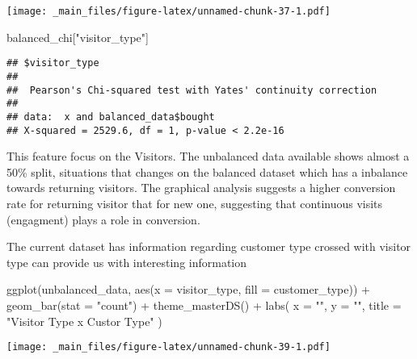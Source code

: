\documentclass[
]{book}
\newenvironment{Shaded}{\begin{snugshade}}{\end{snugshade}}
\newcommand{\AttributeTok}[1]{\textcolor[rgb]{0.77,0.63,0.00}{#1}}
\newcommand{\FunctionTok}[1]{\textcolor[rgb]{0.00,0.00,0.00}{#1}}
\newcommand{\NormalTok}[1]{#1}
\newcommand{\SpecialCharTok}[1]{\textcolor[rgb]{0.00,0.00,0.00}{#1}}
\newcommand{\StringTok}[1]{\textcolor[rgb]{0.31,0.60,0.02}{#1}}
\begin{document}
\begin{Shaded}
\end{Shaded}

\texttt{[image: \_main\_files/figure-latex/unnamed-chunk-37-1.pdf]}

\begin{Shaded}
\begin{Highlighting}[]
\NormalTok{balanced\_chi[}\StringTok{"visitor\_type"}\NormalTok{]}
\end{Highlighting}
\end{Shaded}

\begin{verbatim}
## $visitor_type
## 
##  Pearson's Chi-squared test with Yates' continuity correction
## 
## data:  x and balanced_data$bought
## X-squared = 2529.6, df = 1, p-value < 2.2e-16
\end{verbatim}

This feature focus on the Visitors. The unbalanced data available shows almost a 50\% split, situations that changes on the balanced dataset which has a inbalance towards returning visitors. The graphical analysis suggests a higher conversion rate for returning visitor that for new one, suggesting that continuous visits (engagment) plays a role in conversion.

The current dataset has information regarding customer type crossed with visitor type can provide us with interesting information

\begin{Shaded}
\begin{Highlighting}[]
\FunctionTok{ggplot}\NormalTok{(unbalanced\_data, }\FunctionTok{aes}\NormalTok{(}\AttributeTok{x =}\NormalTok{ visitor\_type, }\AttributeTok{fill =}\NormalTok{ customer\_type)) }\SpecialCharTok{+} 
  \FunctionTok{geom\_bar}\NormalTok{(}\AttributeTok{stat =} \StringTok{"count"}\NormalTok{) }\SpecialCharTok{+} 
  \FunctionTok{theme\_masterDS}\NormalTok{() }\SpecialCharTok{+}
    \FunctionTok{labs}\NormalTok{(}
      \AttributeTok{x =} \StringTok{""}\NormalTok{,}
      \AttributeTok{y =} \StringTok{""}\NormalTok{,}
      \AttributeTok{title =} \StringTok{"Visitor Type x Custor Type"}
\NormalTok{    )}
\end{Highlighting}
\end{Shaded}

\texttt{[image: \_main\_files/figure-latex/unnamed-chunk-39-1.pdf]}
\end{document}
